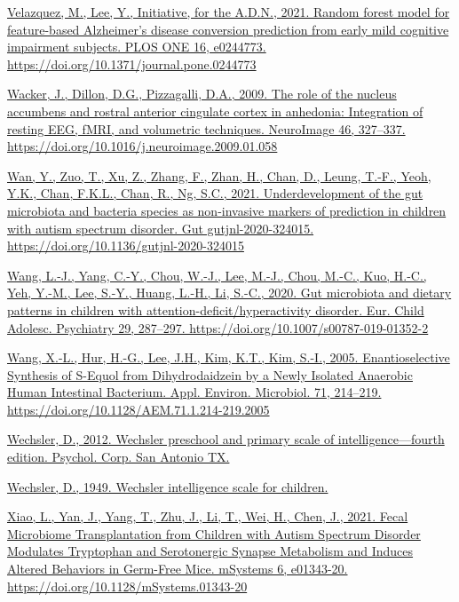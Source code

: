 \documentclass[
]{article}
\begin{document}
\href{https://www.zotero.org/google-docs/?uydJ8e}{Velazquez, M., Lee,
Y., Initiative, for the A.D.N., 2021. Random forest model for
feature-based Alzheimer's disease conversion prediction from early mild
cognitive impairment subjects. PLOS ONE 16, e0244773.
https://doi.org/10.1371/journal.pone.0244773}

\href{https://www.zotero.org/google-docs/?uydJ8e}{Wacker, J., Dillon,
D.G., Pizzagalli, D.A., 2009. The role of the nucleus accumbens and
rostral anterior cingulate cortex in anhedonia: Integration of resting
EEG, fMRI, and volumetric techniques. NeuroImage 46, 327--337.
https://doi.org/10.1016/j.neuroimage.2009.01.058}

\href{https://www.zotero.org/google-docs/?uydJ8e}{Wan, Y., Zuo, T., Xu,
Z., Zhang, F., Zhan, H., Chan, D., Leung, T.-F., Yeoh, Y.K., Chan,
F.K.L., Chan, R., Ng, S.C., 2021. Underdevelopment of the gut microbiota
and bacteria species as non-invasive markers of prediction in children
with autism spectrum disorder. Gut gutjnl-2020-324015.
https://doi.org/10.1136/gutjnl-2020-324015}

\href{https://www.zotero.org/google-docs/?uydJ8e}{Wang, L.-J., Yang,
C.-Y., Chou, W.-J., Lee, M.-J., Chou, M.-C., Kuo, H.-C., Yeh, Y.-M.,
Lee, S.-Y., Huang, L.-H., Li, S.-C., 2020. Gut microbiota and dietary
patterns in children with attention-deficit/hyperactivity disorder. Eur.
Child Adolesc. Psychiatry 29, 287--297.
https://doi.org/10.1007/s00787-019-01352-2}

\href{https://www.zotero.org/google-docs/?uydJ8e}{Wang, X.-L., Hur,
H.-G., Lee, J.H., Kim, K.T., Kim, S.-I., 2005. Enantioselective
Synthesis of S-Equol from Dihydrodaidzein by a Newly Isolated Anaerobic
Human Intestinal Bacterium. Appl. Environ. Microbiol. 71, 214--219.
https://doi.org/10.1128/AEM.71.1.214-219.2005}

\href{https://www.zotero.org/google-docs/?uydJ8e}{Wechsler, D., 2012.
Wechsler preschool and primary scale of intelligence---fourth edition.
Psychol. Corp. San Antonio TX.}

\href{https://www.zotero.org/google-docs/?uydJ8e}{Wechsler, D., 1949.
Wechsler intelligence scale for children.}

\href{https://www.zotero.org/google-docs/?uydJ8e}{Xiao, L., Yan, J.,
Yang, T., Zhu, J., Li, T., Wei, H., Chen, J., 2021. Fecal Microbiome
Transplantation from Children with Autism Spectrum Disorder Modulates
Tryptophan and Serotonergic Synapse Metabolism and Induces Altered
Behaviors in Germ-Free Mice. mSystems 6, e01343-20.
https://doi.org/10.1128/mSystems.01343-20}
\end{document}
